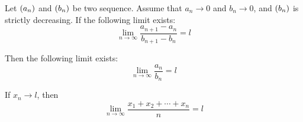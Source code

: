 \begin{theorem}
    Let $\sequence{a_n}$ and $\sequence{b_n}$ be two sequence. Assume that $a_n \rightarrow 0$ and $b_n \rightarrow 0$, and $\sequence{b_n}$ is strictly decreasing. If the following limit exists:
    \begin{equation}
        \lim_{n \rightarrow \infty} \frac{a_{n+1} - a_n}{b_{n+1} - b_n} = l
    \end{equation}
    
    Then the following limit exists:
    \begin{equation}
        \lim_{n \rightarrow \infty} \frac{a_n}{b_n} = l
    \end{equation}
\end{theorem}

\begin{theorem}
    If $x_n \rightarrow l$, then
    \begin{equation}
        \lim_{n \rightarrow \infty} \frac{x_1 + x_2 + \cdots + x_n}{n} = l
    \end{equation}
\end{theorem}

